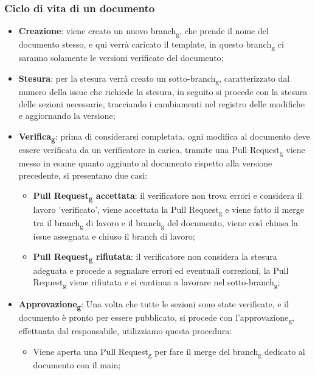         \subsubsection{Ciclo di vita di un documento}
        \begin{itemize}
            \item \textbf{Creazione}: viene creato un nuovo branch\textsubscript{g}, che prende il nome del documento stesso, e qui verrà caricato il template, in questo branch\textsubscript{g} ci saranno solamente le versioni verificate del documento;
            \item \textbf{Stesura}: per la stesura verrà creato un sotto-branch\textsubscript{g}, caratterizzato dal numero della issue che richiede la stesura, in seguito si procede con la stesura delle sezioni necessarie, tracciando i cambiamenti nel registro delle modifiche e aggiornando la versione;
            \item \textbf{Verifica\textsubscript{g}}: prima di considerarsi completata, ogni modifica al documento deve essere verificata da un verificatore in carica, tramite una Pull Request\textsubscript{g} viene messo in esame quanto aggiunto al documento rispetto alla versione precedente, si presentano due casi:
            \begin{itemize}
                \item \textbf{Pull Request\textsubscript{g} accettata}: il verificatore non trova errori e considera il lavoro 'verificato', viene accettata la Pull Request\textsubscript{g} e viene fatto il merge tra il branch\textsubscript{g} di lavoro e il branch\textsubscript{g} del documento, viene così chiusa la issue assegnata e chiuso il branch di lavoro;
                \item \textbf{Pull Request\textsubscript{g} rifiutata}: il verificatore non considera la stesura adeguata e procede a segnalare errori ed eventuali correzioni, la Pull Request\textsubscript{g} viene rifiutata e si continua a lavorare nel sotto-branch\textsubscript{g};
            \end{itemize}
            \item \textbf{Approvazione\textsubscript{g}}: Una volta che tutte le sezioni sono state verificate, e il documento è pronto per essere pubblicato, si procede con l'approvazione\textsubscript{g}, effettuata dal responsabile, utilizziamo questa procedura:
            \begin{itemize}
                \item Viene aperta una Pull Request\textsubscript{g} per fare il merge del branch\textsubscript{g} dedicato al documento con il main;

\end{itemize}
\end{itemize}
